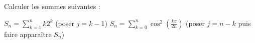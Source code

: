 %
%
	Calculer les sommes suivantes :
	\begin{tasks}
		\task $S_n = \sum\limits_{k=1}^n k2^k$ (poser $j=k-1$)
	    \task $S_n = \sum\limits_{k=0}^n \cos^2 (\frac{k\pi}{2n})$ (poser $j=n-k$ puis faire apparaître $S_n$)
	\end{tasks}
